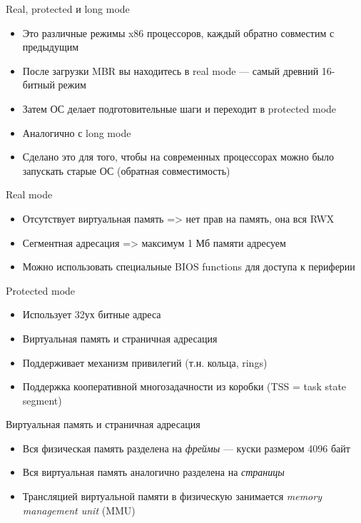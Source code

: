 \documentclass[10pt,pdf,hyperref={unicode}]{beamer}
\begin{document}
\begin{frame}{Real, protected и long mode}
\begin{itemize}
    \item Это различные режимы x86 процессоров, каждый обратно совместим с предыдущим
    \item После загрузки MBR вы находитесь в real mode — самый древний 16-битный режим
    \item Затем ОС делает подготовительные шаги и переходит в protected mode
    \item Аналогично с long mode
    \item Сделано это для того, чтобы на современных процессорах можно было запускать старые ОС (обратная совместимость)
\end{itemize}
\end{frame}

\begin{frame}{Real mode}
\begin{itemize}
    \item Отсутствует виртуальная память => нет прав на память, она вся RWX
    \item Сегментная адресация => максимум 1 Мб памяти адресуем
    \item Можно использовать специальные BIOS functions для доступа к периферии
\end{itemize}
\end{frame}

\begin{frame}{Protected mode}
\begin{itemize}
    \item Использует 32ух битные адреса
    \item Виртуальная память и страничная адресация
    \item Поддерживает механизм привилегий (т.н. кольца, rings)
    \item Поддержка кооперативной многозадачности из коробки (TSS = task state segment)
\end{itemize}
\end{frame}

\begin{frame}{Виртуальная память и страничная адресация}
\begin{itemize}
    \item Вся физическая память разделена на \emph{фреймы} — куски размером 4096 байт
    \item Вся виртуальная память аналогично разделена на \emph{страницы}
    \item Трансляцией виртуальной памяти в физическую занимается \emph{memory management unit} (MMU)
\end{itemize}
\end{frame}
\end{document}
